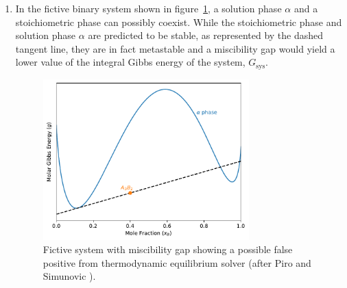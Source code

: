 	\begin{enumerate}
	\item In the fictive binary system shown in figure~\ref{fig:go_sys-AB}, a solution phase $\alpha$ and a stoichiometric phase  can possibly coexist. While the stoichiometric phase  and solution phase $\alpha$ are predicted to be stable, as represented by the dashed tangent line, they are in fact metastable and a miscibility gap would yield a lower value of the integral Gibbs energy of the system, $G_\text{sys}$.
		\begin{figure}[htbp]
			\centering
			\includegraphics[width=0.75\textwidth]{figures/chapter-4/System_AB.pdf}
			\caption[Fictive system with miscibility gap showing a possible false positive from thermodynamic equilibrium solver.]{Fictive system with miscibility gap showing a possible false positive from thermodynamic equilibrium solver (after Piro and Simunovic \cite{Piro16}).}
			\label{fig:go_sys-AB}
		\end{figure}


\end{enumerate}
